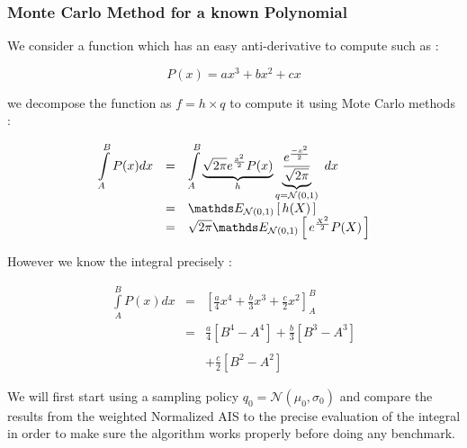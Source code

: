 
\subsubsection{Monte Carlo Method for a known Polynomial}


We consider a function which has an easy anti-derivative to compute such as :


$$P(x) = ax^3 + b x^2 + c x$$

we decompose the function as $f = h \times q $ to compute it using Mote Carlo methods :

$$\begin{array}{rcl}
\displaystyle\int\limits_A^B P(x)dx 
&=& 
\displaystyle\int\limits_A^B \underbrace{\sqrt{2\pi} e^{\frac{x^2} 2}P(x)}_{h} \underbrace{\frac{e^{\frac{-x^2} 2}}{\sqrt{2\pi}}}_{q = \mathcal N(0,1)} \ dx
\\
&=& \esperanceloi{\mathcal N(0,1)}{h(X)} 
\\
&=& \sqrt{2\pi} \esperanceloi{\mathcal N(0,1)} {e^{\frac{X^2} 2}P(X)}
\end{array}$$

However we know the integral precisely :

$$
\begin{array}{rcl}
\displaystyle\int\limits_A^B P(x)dx 
&=& 
\left[ \frac a 4  x^4 + \frac b 3  x^3 + \frac c 2  x^2 \right]^B_A \\
&=& \frac a 4 \left[ B^4 - A^4 \right] + \frac b 3 \left[ B^3 - A^3 \right] 
\\ & &
\\ & &+ \frac c 2 \left[ B^2 - A^2 \right]
\end{array}
$$

We will first start using a sampling policy $q_0 = \mathcal{N}(\mu_0, \sigma_0)$ and compare the results from the weighted Normalized AIS to the precise evaluation of the integral in order to make sure the algorithm works properly before doing any benchmark.
